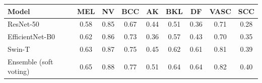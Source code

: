 \begin{tabular}{lcccccccc}
\toprule
Model & MEL & NV & BCC & AK & BKL & DF & VASC & SCC \\
\midrule
ResNet-50 & 0.58 & 0.85 & 0.67 & 0.44 & 0.51 & 0.36 & 0.71 & 0.28 \\
EfficientNet-B0 & 0.62 & 0.86 & 0.73 & 0.36 & 0.57 & 0.43 & 0.70 & 0.35 \\
Swin-T & 0.63 & 0.87 & 0.75 & 0.45 & 0.62 & 0.61 & 0.81 & 0.39 \\
Ensemble (soft voting) & 0.65 & 0.88 & 0.77 & 0.51 & 0.64 & 0.64 & 0.82 & 0.40 \\
\bottomrule
\end{tabular}
